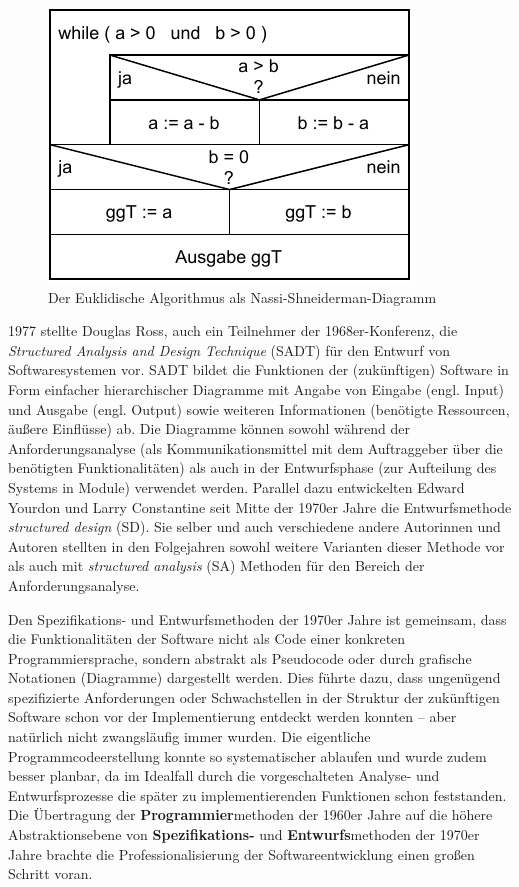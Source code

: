 \begin{figure}[h!]
	\centering
	\includegraphics[scale=1.1]{Bilder/Kapitel-1/Abb-1-5.pdf}
	\caption{Der Euklidische Algorithmus als Nassi-Shneiderman-Diagramm}
	\label{fig:nassi_shneiderman_diagramm}
\end{figure}

1977 stellte Douglas Ross, auch ein Teilnehmer der 1968er-Konferenz, die \textit{\mbox{Structured} Analysis and Design Technique} (SADT) 
für den Entwurf von Softwaresystemen vor. SADT bildet die Funktionen der (zukünftigen) Software in Form einfacher hierarchischer Diagramme mit Angabe von Eingabe (engl. Input) und Ausgabe (engl. Output) sowie weiteren Informationen (\zb benötigte Ressourcen, äußere Einflüsse) ab. Die Diagramme können sowohl während der Anforderungsanalyse (\zb als Kommunikationsmittel mit dem Auftraggeber über die benötigten Funktionalitäten) als auch in der Entwurfsphase (\zb zur Aufteilung des Systems in Module) verwendet werden. Parallel dazu entwickelten Edward Yourdon und Larry Constantine seit Mitte der 1970er Jahre die Entwurfsmethode \textit{structured design} (SD). 
Sie selber und auch verschiedene andere Autorinnen und Autoren stellten in den Folgejahren sowohl weitere Varianten dieser Methode vor als auch mit \textit{structured analysis} (SA) Methoden für den Bereich der Anforderungsanalyse. 
 
Den Spezifikations- und Entwurfsmethoden der 1970er Jahre ist gemeinsam, dass die Funktionalitäten der Software nicht als Code einer konkreten Programmier\-sprache, sondern abstrakt als Pseudocode oder durch grafische Notationen (Diagramme) dargestellt werden. Dies führte dazu, dass ungenügend spezifizierte Anforderungen oder Schwachstellen in der Struktur der zukünftigen Software schon vor der Implementierung entdeckt werden konnten -- aber natürlich nicht zwangsläufig immer wurden. Die eigentliche Programmcodeerstellung konnte so systematischer ablaufen und wurde zudem besser planbar, da im Idealfall durch die vorgeschalteten Analyse- und Entwurfsprozesse die später zu implementierenden Funktionen schon feststanden. Die Übertragung der \textbf{Programmier}methoden der 1960er Jahre auf die höhere Abstraktionsebene von \textbf{Spezifikations-} und \textbf{Entwurfs}methoden der 1970er Jahre brachte die Professionalisierung der Softwareentwicklung einen großen Schritt voran.


